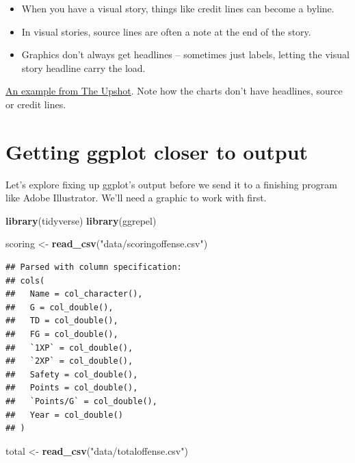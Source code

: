 \documentclass[
]{book}
\newenvironment{Shaded}{\begin{snugshade}}{\end{snugshade}}
\newcommand{\KeywordTok}[1]{\textcolor[rgb]{0.13,0.29,0.53}{\textbf{#1}}}
\newcommand{\NormalTok}[1]{#1}
\newcommand{\StringTok}[1]{\textcolor[rgb]{0.31,0.60,0.02}{#1}}
\providecommand{\tightlist}{%
  \setlength{\itemsep}{0pt}\setlength{\parskip}{0pt}}
\begin{document}
\begin{itemize}
\tightlist
\item
  When you have a visual story, things like credit lines can become a byline.
\item
  In visual stories, source lines are often a note at the end of the story.
\item
  Graphics don't always get headlines -- sometimes just labels, letting the visual story headline carry the load.
\end{itemize}

\href{https://www.nytimes.com/interactive/2018/02/14/business/economy/inflation-prices.html}{An example from The Upshot}. Note how the charts don't have headlines, source or credit lines.

\hypertarget{getting-ggplot-closer-to-output}{%
\section{Getting ggplot closer to output}\label{getting-ggplot-closer-to-output}}

Let's explore fixing up ggplot's output before we send it to a finishing program like Adobe Illustrator. We'll need a graphic to work with first.

\begin{Shaded}
\begin{Highlighting}[]
\KeywordTok{library}\NormalTok{(tidyverse)}
\KeywordTok{library}\NormalTok{(ggrepel)}
\end{Highlighting}
\end{Shaded}

\begin{Shaded}
\begin{Highlighting}[]
\NormalTok{scoring <-}\StringTok{ }\KeywordTok{read_csv}\NormalTok{(}\StringTok{"data/scoringoffense.csv"}\NormalTok{)}
\end{Highlighting}
\end{Shaded}

\begin{verbatim}
## Parsed with column specification:
## cols(
##   Name = col_character(),
##   G = col_double(),
##   TD = col_double(),
##   FG = col_double(),
##   `1XP` = col_double(),
##   `2XP` = col_double(),
##   Safety = col_double(),
##   Points = col_double(),
##   `Points/G` = col_double(),
##   Year = col_double()
## )
\end{verbatim}

\begin{Shaded}
\begin{Highlighting}[]
\NormalTok{total <-}\StringTok{ }\KeywordTok{read_csv}\NormalTok{(}\StringTok{"data/totaloffense.csv"}\NormalTok{)}
\end{Highlighting}
\end{Shaded}
\end{document}

